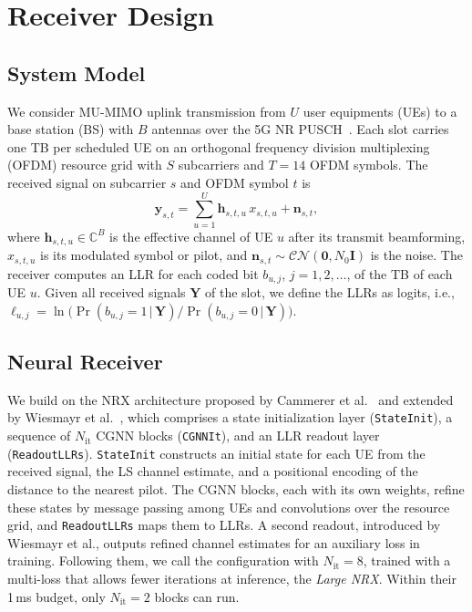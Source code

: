 \section{Receiver Design}

\subsection{System Model}
We consider MU-MIMO uplink transmission from $U$ user equipments (UEs) to a base station (BS) with $B$ antennas over the 5G NR PUSCH~\cite{dahlman2020}. Each slot carries one TB per scheduled UE on an orthogonal frequency division multiplexing (OFDM) resource grid with $S$ subcarriers and $T=14$ OFDM symbols. The received signal on subcarrier $s$ and OFDM symbol $t$ is
\begin{equation}
\mathbf{y}_{s,t}=\sum_{u=1}^{U}\mathbf{h}_{s,t,u}\,x_{s,t,u}+\mathbf{n}_{s,t},
\end{equation}
where $\mathbf{h}_{s,t,u}\in\mathbb{C}^{B}$ is the effective channel of UE $u$ after its transmit beamforming, $x_{s,t,u}$ is its modulated symbol or pilot, and $\mathbf{n}_{s,t}\sim\mathcal{CN}(\mathbf{0},N_0\mathbf{I})$ is the noise. The receiver computes an LLR for each coded bit $b_{u,j}$, $j=1,2,\dots$, of the TB of each UE $u$. Given all received signals $\mathbf{Y}$ of the slot, we define the LLRs as logits, i.e., $\ell_{u,j}=\ln\big(\Pr(b_{u,j}=1\,|\,\mathbf{Y})/\Pr(b_{u,j}=0\,|\,\mathbf{Y})\big)$.

\subsection{Neural Receiver}
We build on the NRX architecture proposed by Cammerer et al.~\cite{cammerer2023neural} and extended by Wiesmayr et al.~\cite{wiesmayr2025realtime}, which comprises a state initialization layer (\texttt{StateInit}), a sequence of $N_{\mathrm{it}}$ CGNN blocks (\texttt{CGNNIt}), and an LLR readout layer (\texttt{ReadoutLLRs}). \texttt{StateInit} constructs an initial state for each UE from the received signal, the LS channel estimate, and a positional encoding of the distance to the nearest pilot. The CGNN blocks, each with its own weights, refine these states by message passing among UEs and convolutions over the resource grid, and \texttt{ReadoutLLRs} maps them to LLRs. A second readout, introduced by Wiesmayr et al., outputs refined channel estimates for an auxiliary loss in training. Following them, we call the configuration with $N_{\mathrm{it}}=8$, trained with a multi-loss that allows fewer iterations at inference, the \emph{Large NRX}. Within their 1\,ms budget, only $N_{\mathrm{it}}=2$ blocks can run.

